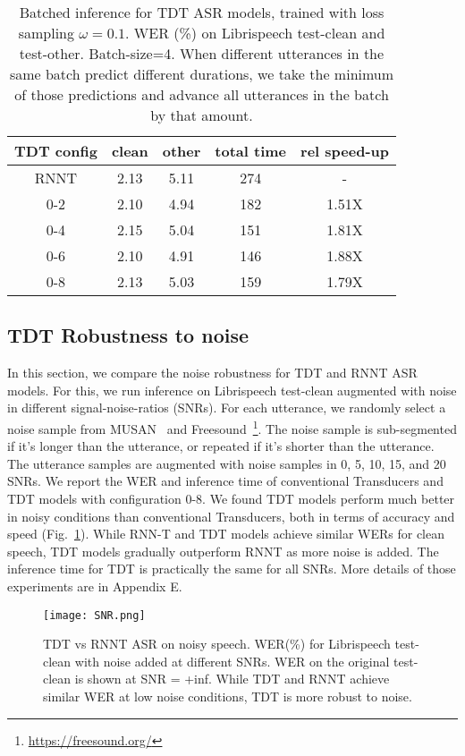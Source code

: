 \documentclass{article}
\begin{document}
\begin{table}[h!]
    \centering
    \begin{tabular}{c c c c c}
    \toprule
       TDT config  & clean & other  & total time & rel speed-up\\
       \midrule
        RNNT & 2.13 & 5.11 & 274 & -     \\
        
        0-2     & 2.10 & 4.94 & 182 & 1.51X \\
        0-4     & 2.15 & 5.04 & 151 & 1.81X \\
        0-6     & 2.10 & 4.91 & 146 & 1.88X \\
        0-8     & 2.13 & 5.03 & 159 & 1.79X \\   
    \bottomrule
    \end{tabular}
    \caption{Batched inference for TDT ASR models, trained with loss sampling $\omega = 0.1$. WER (\%) on Librispeech test-clean and test-other. Batch-size=4. When different utterances in the same batch predict different durations, we take the minimum of those predictions and advance all utterances in the batch by that amount.
    }
    \label{loss_combination}
\end{table}

\subsection{TDT Robustness to noise}
In this section, we compare the noise robustness for TDT and RNNT ASR models. For this, we run inference on Librispeech test-clean augmented with noise in different signal-noise-ratios (SNRs). 
For each utterance, we randomly select a noise sample from MUSAN~\cite{snyder2015musan} and Freesound~\footnote{\url{https://freesound.org/}}. 
The noise sample is sub-segmented if it's longer than the utterance, or repeated if it's shorter than the utterance. The utterance samples are augmented with noise samples in 0, 5, 10, 15, and 20 SNRs.
We report the WER and inference time of conventional Transducers and TDT models with configuration 0-8.
We found TDT models perform much better in noisy conditions than conventional Transducers, both in terms of accuracy and speed (Fig.~\ref{SNR}). While RNN-T and TDT models achieve similar WERs for clean speech, TDT models gradually outperform RNNT as more noise is added.  The inference time for TDT is practically the same for all SNRs. More details of those experiments are in Appendix E.
\begin{figure}[h!]
    \centering
    \texttt{[image: SNR.png]}
    \caption{TDT vs RNNT ASR on noisy speech. WER(\%) for Librispeech test-clean with noise added at different SNRs. WER on the original test-clean is shown at SNR = +inf. While TDT and RNNT achieve similar WER at low noise conditions, TDT is more robust to noise.}
    \label{SNR}
\end{figure}
\end{document}
